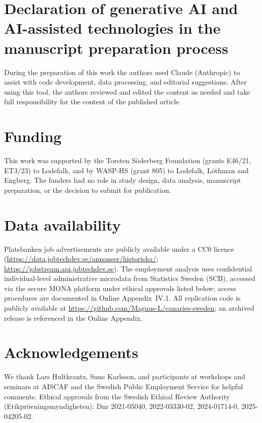 \documentclass[preprint,12pt,authoryear]{elsarticle}
\begin{document}
\section*{Declaration of generative AI and AI-assisted technologies in the manuscript preparation process}
During the preparation of this work the authors used Claude (Anthropic) to assist with code development, data processing, and editorial suggestions. After using this tool, the authors reviewed and edited the content as needed and take full responsibility for the content of the published article.

\section*{Funding}
This work was supported by the Torsten S\"oderberg Foundation (grants E46/21, ET3/23) to Lodefalk, and by WASP-HS (grant 805) to Lodefalk, L\"othman and Engberg. The funders had no role in study design, data analysis, manuscript preparation, or the decision to submit for publication.

\section*{Data availability}
{\sloppy
Platsbanken job advertisements are publicly available under a CC0 licence (\url{https://data.jobtechdev.se/annonser/historiska/}; \url{https://jobstream.api.jobtechdev.se}). The employment analysis uses confidential individual-level administrative microdata from Statistics Sweden (SCB), accessed via the secure MONA platform under ethical approvals listed below; access procedures are documented in Online Appendix~IV.1. All replication code is publicly available at \url{https://github.com/Magnus-L/canaries-sweden}; an archived release is referenced in the Online Appendix.\par}

\section*{Acknowledgements}
We thank Lars Hultkrantz, Sune Karlsson, and participants at workshops and seminars at AISCAF and the Swedish Public Employment Service for helpful comments. Ethical approvals from the Swedish Ethical Review Authority (Etikpr\"ovningsmyndigheten): Dnr 2021-05040, 2022-03330-02, 2024-01714-0, 2025-04205-02.
\end{document}
